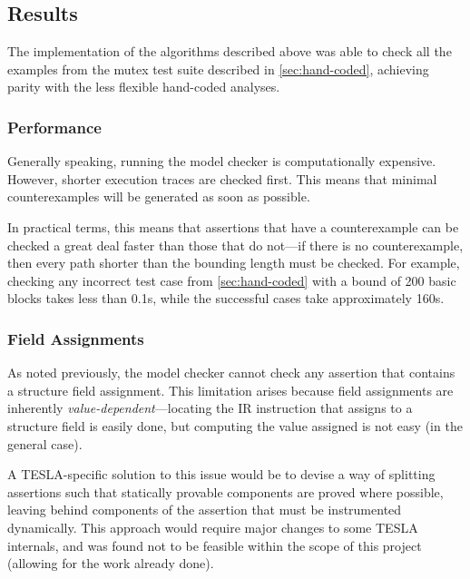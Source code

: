 \subsection{Results} \label{sec:model-limits}

The implementation of the algorithms described above was able to check all the
examples from the mutex test suite described in \autoref{sec:hand-coded},
achieving parity with the less flexible hand-coded analyses.

\subsubsection{Performance}

Generally speaking, running the model checker is computationally expensive.
However, shorter execution traces are checked first. This means that minimal
counterexamples will be generated as soon as possible.

In practical terms, this means that assertions that have a counterexample can be
checked a great deal faster than those that do not---if there is no
counterexample, then every path shorter than the bounding length must be
checked. For example, checking any incorrect test case from
\autoref{sec:hand-coded} with a bound of 200 basic blocks takes less than
\num{0.1}\si{\second}, while the successful cases take approximately
\num{160}\si{\second}.

\subsubsection{Field Assignments}

As noted previously, the model checker cannot check any assertion that
contains a structure field assignment. This limitation arises because
field assignments are inherently \emph{value-dependent}---locating the
IR instruction that assigns to a structure field is easily done, but
computing the value assigned is not easy (in the general case).

A TESLA-specific solution to this issue would be to devise a way of
splitting assertions such that statically provable components are proved
where possible, leaving behind components of the assertion that must be
instrumented dynamically. This approach would require major changes to
some TESLA internals, and was found not to be feasible within the scope
of this project (allowing for the work already done).
